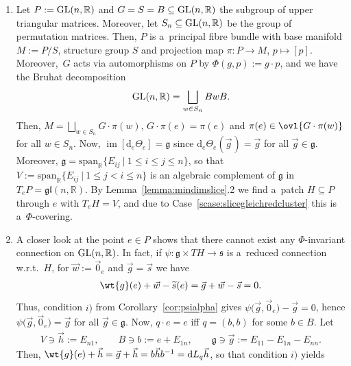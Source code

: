 \documentclass[pdftex]{sigma}
\numberwithin{equation}{section}
\begin{document}
\begin{Example}\label{ex:Bruhat} \quad
\begin{enumerate}\itemsep=0pt
\item
Let $P:={\rm GL}(n,\mathbb{R})$ and $G=S=B \subseteq {\rm GL}(n,\mathbb{R})$ the subgroup of upper triangular mat\-rices.
Moreover, let $S_n\subseteq {\rm GL}(n,\mathbb{R})$ be the group of permutation matrices.
Then, $P$ is a~principal f\/ibre bundle with base manifold $M:=P\slash S$, structure group $S$ and projection map
\mbox{$\pi\colon P\rightarrow M$}, $p\mapsto [p]$.
Moreover,~$G$ acts via automorphisms on $P$ by $\Phi(g,p):=g\cdot p$, and we have the Bruhat decomposition
\begin{gather*}
{\rm GL}(n,\mathbb{R})=\bigsqcup_{w\in S_n}B w B.
\end{gather*}
Then, $M=\bigsqcup_{w\in S_n}G\cdot\pi(w)$, $G\cdot \pi(e)=\pi(e)$ and $\pi(e)\in \ovl{G\cdot\pi(w)}$ for all $w\in S_n$.
Now, $\operatorname{\mathrm{im}}[\mathrm{d}_e\Theta_e]=\mathfrak{g}$ since $\mathrm{d}_e\Theta_e(\vec{g}\hspace{1pt})=\vec{g}$ for
all $\vec{g}\in \mathfrak{g}$.
Moreover, $\mathfrak{g}={\mathrm{span}_\mathbb{R}}\{E_{ij} \:|\: 1\leq i\leq j\leq n\}$, so that
$V:={\mathrm{span}_\mathbb{R}}\{E_{ij} \:|\: 1\leq j<i\leq n\}$ is an algebraic complement of $\mathfrak{g}$ in
$T_eP=\mathfrak{gl}(n,\mathbb{R})$.
By Lemma~\ref{lemma:mindimslice}.2 we f\/ind a~patch $H\subseteq P$ through $e$ with $T_eH=V$, and due to
Case~\ref{scase:slicegleichredcluster} this is a~$\Phi$-covering.
\item
A closer look at the point $e\in P$ shows that there cannot exist any $\Phi$-invariant connection on
${\rm GL}(n,\mathbb{R})$.
In fact, if $\psi\colon \mathfrak{g}\times TH \rightarrow \mathfrak{s}$ is a~reduced connection w.r.t.~$H$, for
$\vec{w}:=\vec{0}_e$ and $\vec{g}=\vec{s}$ we have
\begin{gather*}
\wt{g}(e)+\vec{w} -\widetilde{s}(e)=\vec{g}+\vec{w}-\vec{s}=0.
\end{gather*}
Thus, condition $i)$ from Corollary~\ref{cor:psialpha} gives $\psi\big(\vec{g},\vec{0}_e\big)-\vec{g}=0$, hence
$\psi\big(\vec{g},\vec{0}_e\big)=\vec{g}$ for all $\vec{g}\in \mathfrak{g}$.
Now, $q\cdot e =e$ if\/f $q=(b,b)$ for some $b\in B$.
Let
\begin{gather*}
V\ni\vec{h}:=E_{n1}, \qquad B\ni b:= e + E_{1n}, \qquad \mathfrak{g}\ni \vec{g}:=E_{11}- E_{1n}-
E_{nn}.
\end{gather*}
Then, $\wt{g}(e)+\vec{h}=\vec{g}+\vec{h}=b\vec{h} b^{-1}=\mathrm{d} L_q\vec{h}$, so that condition $i)$ yields

\end{enumerate}
\end{Example}
\end{document}

